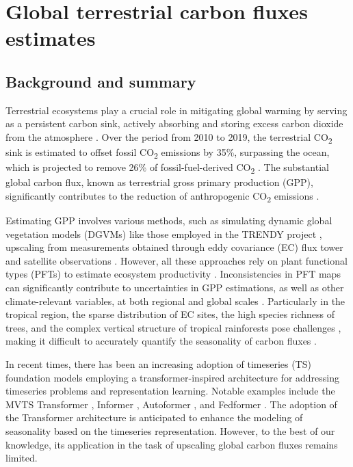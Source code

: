 \section{Global terrestrial carbon fluxes estimates} \label{chap4_s2}

\subsection{Background and summary}
Terrestrial ecosystems play a crucial role in mitigating global warming by serving as a persistent carbon sink, actively absorbing and storing excess carbon dioxide from the atmosphere \citep{pan2011large}. Over the period from 2010 to 2019, the terrestrial CO\textsubscript{2} sink is estimated to offset fossil CO\textsubscript{2} emissions by 35\%, surpassing the ocean, which is projected to remove 26\% of fossil-fuel-derived CO\textsubscript{2} \citep{friedlingstein2020global, wang2022disentangling}. The substantial global carbon flux, known as terrestrial gross primary production (GPP), significantly contributes to the reduction of anthropogenic CO\textsubscript{2} emissions \citep{beer2010terrestrial}. \par

Estimating GPP involves various methods, such as simulating dynamic global vegetation models (DGVMs) like those employed in the TRENDY project \citep{sitch2015recent, le2018global}, upscaling from measurements obtained through eddy covariance (EC) flux tower and satellite observations \citep{jung2019fluxcom, zeng2020global}. However, all these approaches rely on plant functional types (PFTs) to estimate ecosystem productivity \citep{poulter2011plant, poulter2015plant, lin2021improved, guo2023estimating, yan2023integrating}. Inconsistencies in PFT maps can significantly contribute to uncertainties in GPP estimations, as well as other climate-relevant variables, at both regional and global scales \citep{poulter2011plant}. Particularly in the tropical region, the sparse distribution of EC sites, the high species richness of trees, and the complex vertical structure of tropical rainforests pose challenges \citep{montgomery2001forest}, making it difficult to accurately quantify the seasonality of carbon fluxes \citep{xu2015satellite}. \par

In recent times, there has been an increasing adoption of timeseries (TS) foundation models employing a transformer-inspired architecture for addressing timeseries problems and representation learning. Notable examples include the MVTS Transformer \citep{zerveas2021transformer}, Informer \citep{zhou2021informer}, Autoformer \citep{wu2021autoformer}, and Fedformer \citep{zhou2022fedformer}. The adoption of the Transformer architecture is anticipated to enhance the modeling of seasonality based on the timeseries representation. However, to the best of our knowledge, its application in the task of upscaling global carbon fluxes remains limited. \par


